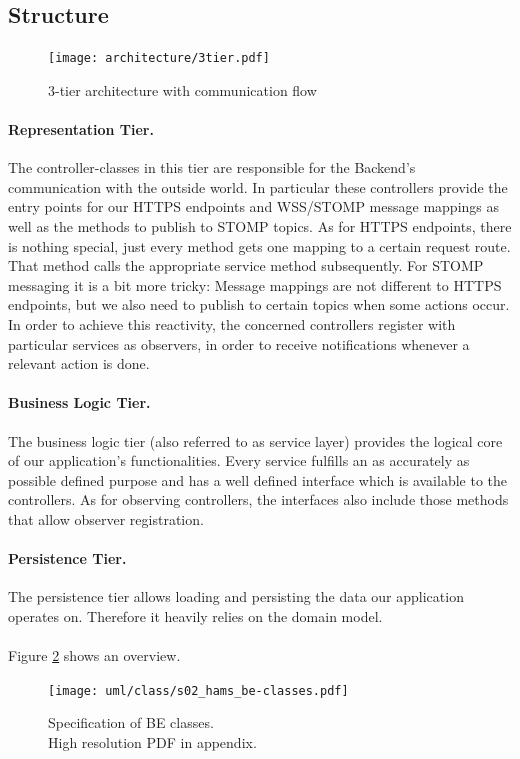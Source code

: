\documentclass{scrreprt}
\begin{document}
\subsection{Structure}
\begin{figure}[h]
	\centering
	\texttt{[image: architecture/3tier.pdf]}
	\caption{3-tier architecture with communication flow}
	\label{3tier}
\end{figure}
\paragraph{Representation Tier.} The controller-classes in this tier are responsible for the
Backend's communication with the outside world. In particular these controllers provide the
entry points for our HTTPS endpoints and WSS/STOMP message mappings as well as the methods to
publish to STOMP topics.
As for HTTPS endpoints, there is nothing special, just every method gets one mapping to a
certain request route. That method calls the appropriate service method subsequently. For
STOMP messaging it is a bit more tricky: Message mappings are not different to HTTPS endpoints,
but we also need to publish to certain topics when some actions occur. In order to achieve
this reactivity, the concerned controllers register with particular services as observers,
in order to receive notifications whenever a relevant action is done.
\paragraph{Business Logic Tier.} The business logic tier (also referred to as service layer)
provides the logical core of our application's functionalities. Every service fulfills an as
accurately as possible defined purpose and has a well defined interface which is available to
the controllers. As for observing controllers, the interfaces also include those methods
that allow observer registration.
\paragraph{Persistence Tier.} The persistence tier allows loading and persisting the data
our application operates on. Therefore it heavily relies on the domain model.
\paragraph{} Figure \ref{beclass} shows an overview.
\begin{figure}[!h]
	\centering
	\texttt{[image: uml/class/s02\_hams\_be-classes.pdf]}
	\caption{Specification of BE classes. \\ High resolution PDF in appendix.}
	\label{beclass}
\end{figure}
\end{document}
